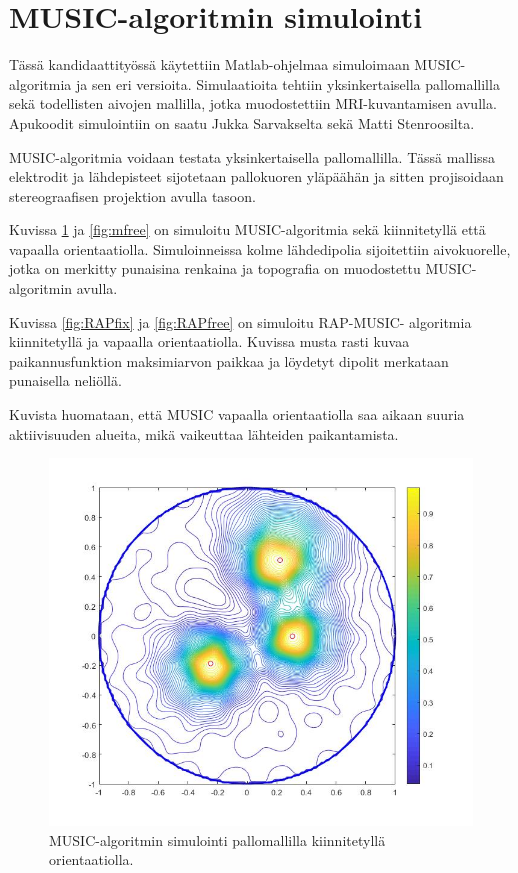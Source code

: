 \section{MUSIC-algoritmin simulointi}
Tässä kandidaattityössä käytettiin Matlab-ohjelmaa simuloimaan MUSIC-algoritmia ja sen eri versioita. Simulaatioita tehtiin yksinkertaisella pallomallilla sekä todellisten aivojen mallilla, jotka muodostettiin MRI-kuvantamisen avulla. Apukoodit simulointiin on saatu Jukka Sarvakselta sekä Matti Stenroosilta.

MUSIC-algoritmia voidaan testata yksinkertaisella pallomallilla. Tässä mallissa elektrodit ja lähdepisteet sijotetaan pallokuoren yläpäähän ja sitten projisoidaan stereograafisen projektion avulla tasoon.

Kuvissa \ref{fig:mfix} ja \ref{fig:mfree} on simuloitu MUSIC-algoritmia sekä kiinnitetyllä että vapaalla orientaatiolla. Simuloinneissa kolme lähdedipolia sijoitettiin aivokuorelle, jotka on merkitty punaisina renkaina ja topografia on muodostettu MUSIC-algoritmin avulla.

Kuvissa \ref{fig:RAPfix} ja \ref{fig:RAPfree} on simuloitu RAP-MUSIC- algoritmia kiinnitetyllä ja vapaalla orientaatiolla. Kuvissa musta rasti kuvaa paikannusfunktion maksimiarvon paikkaa ja löydetyt dipolit merkataan punaisella neliöllä.

Kuvista huomataan, että MUSIC vapaalla orientaatiolla saa aikaan suuria aktiivisuuden alueita, mikä vaikeuttaa lähteiden paikantamista.


\clearpage
\begin{figure}[h]
    \centering
    \includegraphics[scale=0.38]{mfix.jpg}
    \caption{MUSIC-algoritmin simulointi pallomallilla kiinnitetyllä orientaatiolla.}
    \label{fig:mfix}
\end{figure}

